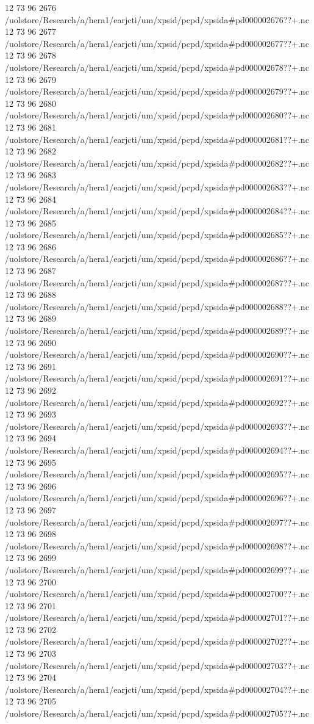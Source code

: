 12 73 96
2676
/uolstore/Research/a/hera1/earjcti/um/xpsid/pcpd/xpsida#pd000002676??+.nc
12 73 96
2677
/uolstore/Research/a/hera1/earjcti/um/xpsid/pcpd/xpsida#pd000002677??+.nc
12 73 96
2678
/uolstore/Research/a/hera1/earjcti/um/xpsid/pcpd/xpsida#pd000002678??+.nc
12 73 96
2679
/uolstore/Research/a/hera1/earjcti/um/xpsid/pcpd/xpsida#pd000002679??+.nc
12 73 96
2680
/uolstore/Research/a/hera1/earjcti/um/xpsid/pcpd/xpsida#pd000002680??+.nc
12 73 96
2681
/uolstore/Research/a/hera1/earjcti/um/xpsid/pcpd/xpsida#pd000002681??+.nc
12 73 96
2682
/uolstore/Research/a/hera1/earjcti/um/xpsid/pcpd/xpsida#pd000002682??+.nc
12 73 96
2683
/uolstore/Research/a/hera1/earjcti/um/xpsid/pcpd/xpsida#pd000002683??+.nc
12 73 96
2684
/uolstore/Research/a/hera1/earjcti/um/xpsid/pcpd/xpsida#pd000002684??+.nc
12 73 96
2685
/uolstore/Research/a/hera1/earjcti/um/xpsid/pcpd/xpsida#pd000002685??+.nc
12 73 96
2686
/uolstore/Research/a/hera1/earjcti/um/xpsid/pcpd/xpsida#pd000002686??+.nc
12 73 96
2687
/uolstore/Research/a/hera1/earjcti/um/xpsid/pcpd/xpsida#pd000002687??+.nc
12 73 96
2688
/uolstore/Research/a/hera1/earjcti/um/xpsid/pcpd/xpsida#pd000002688??+.nc
12 73 96
2689
/uolstore/Research/a/hera1/earjcti/um/xpsid/pcpd/xpsida#pd000002689??+.nc
12 73 96
2690
/uolstore/Research/a/hera1/earjcti/um/xpsid/pcpd/xpsida#pd000002690??+.nc
12 73 96
2691
/uolstore/Research/a/hera1/earjcti/um/xpsid/pcpd/xpsida#pd000002691??+.nc
12 73 96
2692
/uolstore/Research/a/hera1/earjcti/um/xpsid/pcpd/xpsida#pd000002692??+.nc
12 73 96
2693
/uolstore/Research/a/hera1/earjcti/um/xpsid/pcpd/xpsida#pd000002693??+.nc
12 73 96
2694
/uolstore/Research/a/hera1/earjcti/um/xpsid/pcpd/xpsida#pd000002694??+.nc
12 73 96
2695
/uolstore/Research/a/hera1/earjcti/um/xpsid/pcpd/xpsida#pd000002695??+.nc
12 73 96
2696
/uolstore/Research/a/hera1/earjcti/um/xpsid/pcpd/xpsida#pd000002696??+.nc
12 73 96
2697
/uolstore/Research/a/hera1/earjcti/um/xpsid/pcpd/xpsida#pd000002697??+.nc
12 73 96
2698
/uolstore/Research/a/hera1/earjcti/um/xpsid/pcpd/xpsida#pd000002698??+.nc
12 73 96
2699
/uolstore/Research/a/hera1/earjcti/um/xpsid/pcpd/xpsida#pd000002699??+.nc
12 73 96
2700
/uolstore/Research/a/hera1/earjcti/um/xpsid/pcpd/xpsida#pd000002700??+.nc
12 73 96
2701
/uolstore/Research/a/hera1/earjcti/um/xpsid/pcpd/xpsida#pd000002701??+.nc
12 73 96
2702
/uolstore/Research/a/hera1/earjcti/um/xpsid/pcpd/xpsida#pd000002702??+.nc
12 73 96
2703
/uolstore/Research/a/hera1/earjcti/um/xpsid/pcpd/xpsida#pd000002703??+.nc
12 73 96
2704
/uolstore/Research/a/hera1/earjcti/um/xpsid/pcpd/xpsida#pd000002704??+.nc
12 73 96
2705
/uolstore/Research/a/hera1/earjcti/um/xpsid/pcpd/xpsida#pd000002705??+.nc
